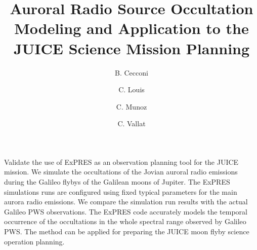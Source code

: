 \documentclass[referee]{aa}
\begin{document}
 


   \title{Auroral Radio Source Occultation Modeling and Application to the JUICE Science Mission Planning}
   
   \subtitle{}

   \author{B. Cecconi
          \and
          C. Louis
          \and 
          C. Munoz
          \and 
          C. Vallat
          }
    
    
    

   \date{}

 
  \abstract
   {}
   {Validate the use of ExPRES as an observation planning tool for the JUICE mission.}
   {We simulate the occultations of the Jovian auroral radio emissions during the Galileo flybys of the Galilean moons of Jupiter. The ExPRES simulations runs are configured using fixed typical parameters for the main aurora radio emissions. We compare the simulation run results with the actual Galileo PWS observations.}
   {The ExPRES code accurately models the temporal occurrence of the occultations in the whole spectral range observed by Galileo PWS.}
   {The method can be applied for preparing the JUICE moon flyby science operation planning.}


   \maketitle
%
\end{document}
